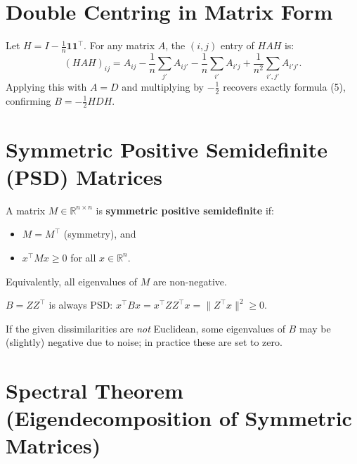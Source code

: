 \documentclass[11pt]{article}
\begin{document}
\begin{center}
\end{center}

\appendix
\section{Double Centring in Matrix Form}

Let $H = I - \frac{1}{n}\mathbf{1}\mathbf{1}^{\top}$.
For any matrix $A$, the $(i,j)$ entry of $HAH$ is:
\[
  (HAH)_{ij}
  = A_{ij}
  - \frac{1}{n}\sum_{j'}A_{ij'}
  - \frac{1}{n}\sum_{i'}A_{i'j}
  + \frac{1}{n^2}\sum_{i',j'}A_{i'j'}.
\]
Applying this with $A = D$ and multiplying by $-\tfrac{1}{2}$ recovers
exactly formula (5), confirming $B = -\tfrac{1}{2}HDH$.

\section{Symmetric Positive Semidefinite (PSD) Matrices}

A matrix $M \in \mathbb{R}^{n\times n}$ is \textbf{symmetric positive
semidefinite} if:
\begin{itemize}
  \item $M = M^{\top}$ (symmetry), and
  \item $x^{\top}Mx \ge 0$ for all $x \in \mathbb{R}^n$.
\end{itemize}
Equivalently, all eigenvalues of $M$ are non-negative.

$B = ZZ^{\top}$ is always PSD:
$x^{\top}Bx = x^{\top}ZZ^{\top}x = \|Z^{\top}x\|^2 \ge 0$.

If the given dissimilarities are \emph{not} Euclidean, some eigenvalues of
$B$ may be (slightly) negative due to noise; in practice these are set to
zero.

\section{Spectral Theorem (Eigendecomposition of Symmetric Matrices)}
\end{document}
